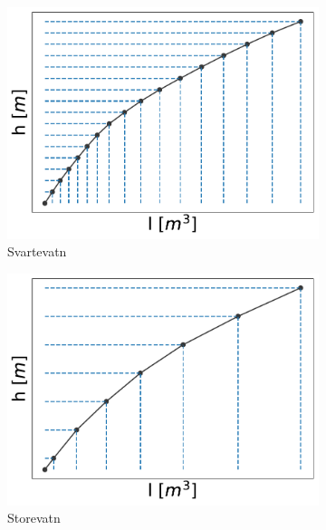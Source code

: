 \begin{figure}[h]
     \centering
          \begin{subfigure}[b]{0.25\textwidth}
         \centering
         \includegraphics[width=\textwidth]{head_res_relation_Svartevatn1.pdf}
         \caption{Svartevatn}
         \label{fig:head_res_relation_Svartevatn}
     \end{subfigure}
     \hfill
     \begin{subfigure}[b]{0.25\textwidth}
         \centering
         \includegraphics[width=\textwidth]{head_res_relation_Storevatn1.pdf}
         \caption{Storevatn}
         \label{fig:head_res_relation_Storevatn}
     \end{subfigure}
     \hfill
     \begin{subfigure}[b]{0.25\textwidth}

\end{subfigure}
\end{figure}
